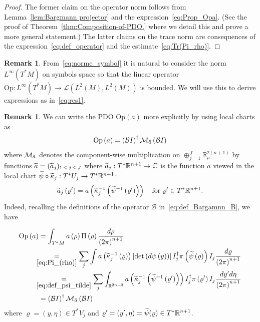 \documentclass[10pt]{amsart}
\theoremstyle{definition}\newtheorem{defi}[theo]{Definition}\newtheorem{rema}[theo]{Remark}\newtheorem{exam}[theo]{Example}\newtheorem{exem}[theo]{Example}\newtheorem{nota}[theo]{Notation}
\newcommand{\clL}{\mathcal{L}}
\newcommand{\clM}{\mathcal{M}}
\newcommand{\clB}{\mathcal{B}}
\newcommand{\Opp}{\mathrm{Op}}
\newcommand{\bbR}{\mathbb{R}}
\newcommand{\bbC}{\mathbb{C}}
\let\oldtilde\tilde
\renewcommand*{\tilde}[1]{\mathchoice{\widetilde{#1}}{\widetilde{#1}}{\oldtilde{#1}}{\oldtilde{#1}}}
\begin{document}
\begin{proof}
The former claim on the operator norm follows from Lemma~\ref{lem:Bargmann projector} and the expression~\eqref{eq:Prop_Opa}. (See the proof of Theorem~\ref{thm:Composition-of-PDO.} where we detail this and prove a more general statement.) The latter claims on the trace norm are consequences of the expression~\eqref{eq:def_operator} and the estimate~\eqref{eq:Tr(Pi_rho)}.
\end{proof}
\begin{rema}
From~\eqref{eq:norme_symbol} it is natural to consider the norm $L^{\infty}(T^{*}M)$ on symbols space so that the linear operator $\Opp :L^{\infty}(T^{*}M)\rightarrow\clL(L^{2}(M),L^{2}(M))$ is bounded. We will use this to derive expressions as in~\eqref{eq:res1}.
\end{rema}


\begin{rema}
We can write the PDO $\Opp (a)$ more explicitly by using local charts as
\begin{equation}\label{eq:Prop_Opa}
\Opp \left(a\right)=\left(\clB I\right)^{\dagger}\clM_{\tilde{a}}\left(\clB I\right)
\end{equation}
where $\clM_{\tilde{a}}$ denotes the component-wise multiplication on $\oplus_{j=1}^{J}\bbR_{\varrho}^{2(n+1)}$ by functions $\tilde{a}=(\tilde{a}_{j})_{1\,\le\,j\,\le\,J}$ where $\tilde{a}_{j}:T^{*}\bbR^{n+1}\to\bbC$ is the function $a$ viewed in the local chart $\tilde{\psi}\circ\tilde{\kappa}_{j}:T^{*}U_{j}\to T^{*}\bbR^{n+1}$:
\begin{equation}\label{eq:def_a_tilde_j}
\tilde{a}_{j}\left(\varrho'\right)=a\left(\tilde{\kappa}_{j}^{-1}\left(\tilde{\psi}^{-1}\left(\varrho'\right)\right)\right)\quad\text{for }\varrho'\in T^{*}\bbR^{n+1}.
\end{equation}
Indeed, recalling the definitions of the operator $\clB$ in~\eqref{eq:def_Bargamnn_B}, we have
\end{rema}
\begin{equation}\label{eq:Op_a}
\begin{split}
\Opp \left(a\right) & =\int_{T^{*}M}a\left(\rho\right)\Pi\left(\rho\right)\frac{d\rho}{\left(2\pi\right)^{n+1}}
\\
& \mkern-10mu\underset{\eqref{eq:Pi_(rho)}}{=}\sum_{j}\int a\left(\tilde{\kappa}_{j}^{-1}\left(\varrho\right)\right)\left|\det \left(d\psi\left(y\right)\right)\right|I_{j}^{\dagger}\pi\left(\tilde{\psi}\left(\varrho\right)\right)I_{j}\frac{d\varrho}{\left(2\pi\right)^{n+1}} \\
& \mkern-10mu\underset{\eqref{eq:def_psi_tilde}}{=}\sum_{j}\int_{\bbR^{2n+2}}a\left(\tilde{\kappa}_{j}^{-1}\left(\tilde{\psi}^{-1}\left(\varrho'\right)\right)\right)I_{j}^{\dagger}\pi\left(\varrho'\right)I_{j}\frac{dy'd\eta}{\left(2\pi\right)^{n+1}} \\
& =\left(\clB I\right)^{\dagger}\clM_{\tilde{a}}\left(\clB I\right)
\end{split}
\end{equation}
where $\varrho=(y,\eta)\in T^{*}V_{j}$ and $\varrho'=(y',\eta)=\tilde{\psi}(\varrho)\in T^{*}\bbR^{n+1}$.
\end{document}
